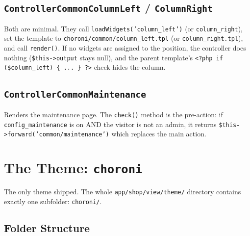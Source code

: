 \documentclass[11pt,a4paper]{article}
\begin{document}
\subsection{\texttt{ControllerCommonColumnLeft} / \texttt{ColumnRight}}

Both are minimal. They call \texttt{loadWidgets('column\_left')}
(or \texttt{column\_right}), set the template to
\texttt{choroni/common/column\_left.tpl} (or
\texttt{column\_right.tpl}), and call \texttt{render()}. If no
widgets are assigned to the position, the controller does nothing
(\texttt{\$this->output} stays null), and the parent template's
\texttt{<?php if (\$column\_left) \{ ... \} ?>} check hides the
column.

\subsection{\texttt{ControllerCommonMaintenance}}

Renders the maintenance page. The \texttt{check()} method is the
pre-action: if \texttt{config\_maintenance} is on AND the visitor
is not an admin, it returns \texttt{\$this->forward('common/maintenance')}
which replaces the main action.

\section{The Theme: \texttt{choroni}}\label{sec:theme}

The only theme shipped. The whole \texttt{app/shop/view/theme/}
directory contains exactly one subfolder: \texttt{choroni/}.

\subsection{Folder Structure}
\end{document}
